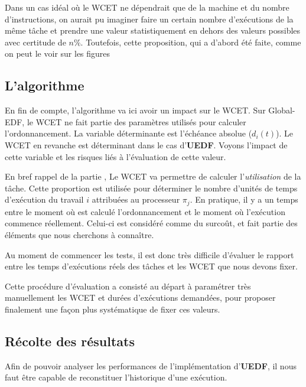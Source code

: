 	Dans un cas idéal où le WCET ne dépendrait que de la machine et du nombre d'instructions, 
	on aurait pu imaginer faire un certain nombre d'exécutions de la même tâche et prendre une valeur 
	statistiquement en dehors des valeurs possibles avec certitude de $n\%$. 
	Toutefois, cette proposition, qui a d'abord été faite, comme on peut le voir sur les figures  	

	\subsection{L'algorithme}
	
	En fin de compte, l'algorithme va ici avoir un impact sur le WCET. 
	Sur Global-EDF, le WCET ne fait partie des paramètres utilisés pour calculer 
	l'ordonnancement. La variable déterminante est l'échéance absolue ($d_i(t)$). 
	Le WCET en revanche est déterminant dans le cas d'\textbf{UEDF}. Voyons 
	l'impact de cette variable et les risques liés à l'évaluation de cette valeur.\newline
	
	En bref rappel de la partie , 
	Le WCET va permettre de calculer l'\textit{utilisation} de la tâche. 
	Cette proportion est utilisée pour déterminer le nombre d'unités de temps d'exécution 
	du travail $i$ attribuées au processeur $\pi_j$. \newline
	En pratique, il y a un temps entre le moment où est calculé l'ordonnancement et le 
	moment où l'exécution commence réellement. Celui-ci est considéré comme du surcoût, et 
	fait partie des éléments que nous cherchons à connaître. \newline
	
	Au moment de commencer les tests, il est donc très difficile d'évaluer le rapport 
	entre les temps d'exécutions réels des tâches et les WCET que nous devons fixer. \newline
	
	Cette procédure d'évaluation a consisté au départ à paramétrer très manuellement les WCET et 
	durées d'exécutions demandées, pour proposer finalement une façon plus systématique 
	de fixer ces valeurs.

		
\subsection{Récolte des résultats}
	Afin de pouvoir analyser les performances de l'implémentation d'\textbf{UEDF}, il nous faut être capable de reconstituer 
	l'historique d'une exécution. \newline
	

